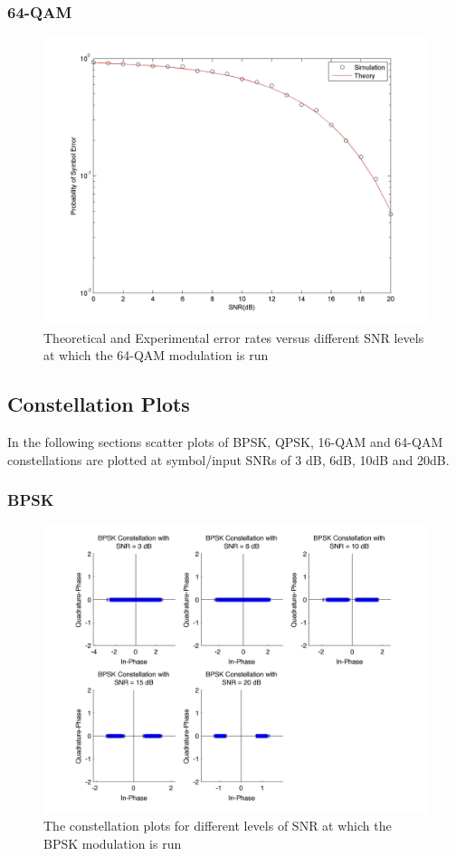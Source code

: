 \documentclass[]{article}
\begin{document}
\subsubsection{64-QAM}
\begin{figure}[H]
\centering
\hspace*{-2cm}\includegraphics[width=1.3\textwidth]{qam64SNR.jpg}
\caption{Theoretical and Experimental error rates versus different SNR levels at which the 64-QAM modulation is run }
\end{figure}
\subsection{Constellation Plots}
In the following sections scatter plots of BPSK, QPSK, 16-QAM and 64-QAM constellations are plotted at symbol/input SNRs of 3 dB, 6dB, 10dB and 20dB.

\subsubsection{BPSK}
\begin{figure}[H]
\centering
\hspace*{-2cm}\includegraphics[width=1.3\textwidth]{bpConst.jpg}
\caption{The constellation plots for different levels of SNR at which the BPSK modulation is run }
\end{figure}
\end{document}
